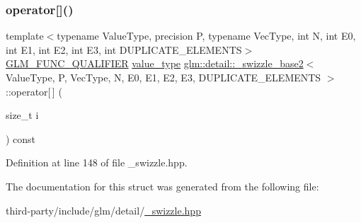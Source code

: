 \subsubsection{\texorpdfstring{operator[]()}{operator[]()}\hspace{0.1cm}{\footnotesize\ttfamily [2/2]}}
{\footnotesize\ttfamily template$<$typename Value\+Type, precision P, typename Vec\+Type, int N, int E0, int E1, int E2, int E3, int D\+U\+P\+L\+I\+C\+A\+T\+E\+\_\+\+E\+L\+E\+M\+E\+N\+TS$>$ \\
\hyperlink{setup_8hpp_a33fdea6f91c5f834105f7415e2a64407}{G\+L\+M\+\_\+\+F\+U\+N\+C\+\_\+\+Q\+U\+A\+L\+I\+F\+I\+ER} \hyperlink{structglm_1_1detail_1_1__swizzle__base2_a656c11aaeeaca042deed88711c9dc063}{value\+\_\+type} \hyperlink{structglm_1_1detail_1_1__swizzle__base2}{glm\+::detail\+::\+\_\+swizzle\+\_\+base2}$<$ Value\+Type, P, Vec\+Type, N, E0, E1, E2, E3, D\+U\+P\+L\+I\+C\+A\+T\+E\+\_\+\+E\+L\+E\+M\+E\+N\+TS $>$\+::operator\mbox{[}$\,$\mbox{]} (\begin{DoxyParamCaption}\item[{size\+\_\+t}]{i }\end{DoxyParamCaption}) const\hspace{0.3cm}{\ttfamily [inline]}}



Definition at line 148 of file \+\_\+swizzle.\+hpp.



The documentation for this struct was generated from the following file\+:\begin{DoxyCompactItemize}
\item 
third-\/party/include/glm/detail/\hyperlink{__swizzle_8hpp}{\+\_\+swizzle.\+hpp}\end{DoxyCompactItemize}
